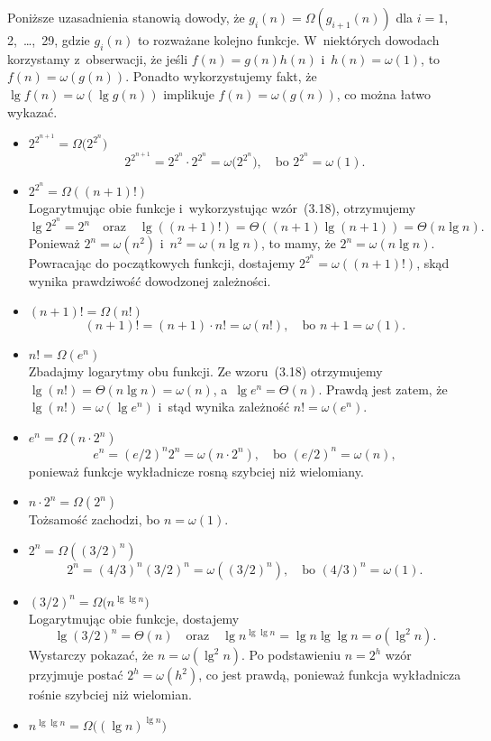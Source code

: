 \subproblem %
Poniższe uzasadnienia stanowią dowody, że $g_i(n)=\Omega(g_{i+1}(n))$ dla $i=1$, 2,~\dots,~29, gdzie $g_i(n)$ to rozważane kolejno funkcje. W~niektórych dowodach korzystamy z~obserwacji, że jeśli $f(n)=g(n)h(n)$ i~$h(n)=\omega(1)$, to $f(n)=\omega(g(n))$. Ponadto wykorzystujemy fakt, że $\lg f(n)=\omega(\lg g(n))$ implikuje $f(n)=\omega(g(n))$, co można łatwo wykazać.
\begin{itemize}
\item $2^{2^{n+1}}=\Omega\bigl(2^{2^n}\bigr)$
	\[
		2^{2^{n+1}} = 2^{2^n}\cdot2^{2^n} = \omega\bigl(2^{2^n}\bigr), \quad\text{bo $2^{2^n} = \omega(1)$}.
	\]
\item $2^{2^n}=\Omega((n+1)!)$ \\
	Logarytmując obie funkcje i~wykorzystując wzór~(3.18), otrzymujemy
	\[
		\lg 2^{2^n} = 2^n \quad\text{oraz}\quad \lg((n+1)!) = \Theta((n+1)\lg(n+1)) = \Theta(n\lg n).
	\]
	Ponieważ $2^n=\omega(n^2)$ i~$n^2=\omega(n\lg n)$, to mamy, że $2^n=\omega(n\lg n)$. Powracając do początkowych funkcji, dostajemy $2^{2^n}=\omega((n+1)!)$, skąd wynika prawdziwość dowodzonej zależności.
\item $(n+1)!=\Omega(n!)$
	\[
		(n+1)! = (n+1)\cdot n! = \omega(n!), \quad\text{bo $n+1 = \omega(1)$}.
	\]
\item $n!=\Omega(e^n)$ \\
	Zbadajmy logarytmy obu funkcji. Ze wzoru~(3.18) otrzymujemy $\lg(n!)=\Theta(n\lg n)=\omega(n)$, a~$\lg e^n=\Theta(n)$. Prawdą jest zatem, że $\lg(n!)=\omega(\lg e^n)$ i~stąd wynika zależność $n!=\omega(e^n)$.
\item $e^n=\Omega(n\cdot2^n)$
	\[
		e^n = (e/2)^n2^n = \omega(n\cdot2^n), \quad\text{bo $(e/2)^n = \omega(n)$},
	\]
	ponieważ funkcje wykładnicze rosną szybciej niż wielomiany.
\item $n\cdot2^n=\Omega(2^n)$ \\
	Tożsamość zachodzi, bo $n=\omega(1)$.
\item $2^n=\Omega((3/2)^n)$
	\[
		2^n = (4/3)^n(3/2)^n = \omega((3/2)^n), \quad\text{bo $(4/3)^n = \omega(1)$}.
	\]
\item $(3/2)^n=\Omega\bigl(n^{\lg\lg n}\bigr)$ \\
	Logarytmując obie funkcje, dostajemy
	\[
		\lg(3/2)^n = \Theta(n) \quad\text{oraz}\quad \lg n^{\lg\lg n} = \lg n\lg\lg n = o(\lg^2n).
	\]
	Wystarczy pokazać, że $n=\omega(\lg^2n)$. Po podstawieniu $n=2^h$ wzór przyjmuje postać $2^h=\omega(h^2)$, co jest prawdą, ponieważ funkcja wykładnicza rośnie szybciej niż wielomian.
\item $n^{\lg\lg n}=\Omega\bigl((\lg n)^{\lg n}\bigr)$ \\

\end{itemize}
